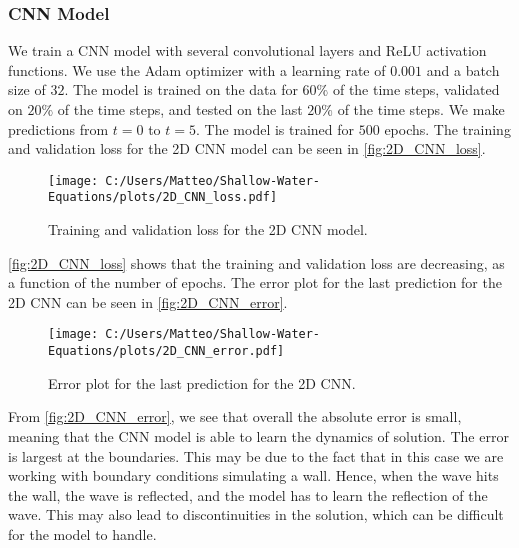 \subsubsection*{CNN Model}
We train a CNN model with several convolutional layers and ReLU activation functions.
We use the Adam optimizer with a learning rate of $0.001$ and a batch size of $32$.
The model is trained on the data for $60\%$ of the time steps, validated on $20\%$ of the time steps, and tested on the last $20\%$ of the time steps.
We make predictions from $t = 0$ to $t = 5$.
The model is trained for $500$ epochs.
The training and validation loss for the 2D CNN model can be seen in \autoref{fig:2D_CNN_loss}.
\begin{figure}[H]
    \centering
    \texttt{[image: C:/Users/Matteo/Shallow-Water-Equations/plots/2D\_CNN\_loss.pdf]}
    \caption{Training and validation loss for the 2D CNN model.}\label{fig:2D_CNN_loss}
\end{figure}
\autoref{fig:2D_CNN_loss} shows that the training and validation loss are decreasing, as a function of the number of epochs.
The error plot for the last prediction for the 2D CNN can be seen in \autoref{fig:2D_CNN_error}.
\begin{figure}[H]
    \centering
    \texttt{[image: C:/Users/Matteo/Shallow-Water-Equations/plots/2D\_CNN\_error.pdf]}
    \caption{Error plot for the last prediction for the 2D CNN.}\label{fig:2D_CNN_error}
\end{figure}
From \autoref{fig:2D_CNN_error}, we see that overall the absolute error is small, meaning that the CNN model is able to learn the dynamics of solution.
The error is largest at the boundaries. 
This may be due to the fact that in this case we are working with boundary conditions simulating a wall.
Hence, when the wave hits the wall, the wave is reflected, and the model has to learn the reflection of the wave.
This may also lead to discontinuities in the solution, which can be difficult for the model to handle.

